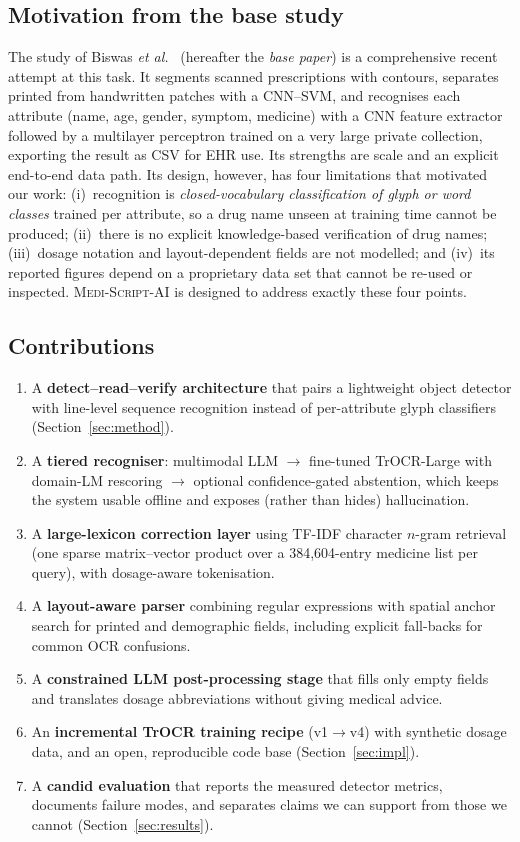 \documentclass[journal]{IEEEtran}
\newcommand{\sys}{\textsc{Medi-Script-AI}}
\begin{document}
\subsection{Motivation from the base study}
The study of Biswas \emph{et al.}~\cite{biswas2026novel} (hereafter the \emph{base paper}) is a comprehensive recent attempt at this task. It segments scanned prescriptions with contours, separates printed from handwritten patches with a CNN--SVM, and recognises each attribute (name, age, gender, symptom, medicine) with a CNN feature extractor followed by a multilayer perceptron trained on a very large private collection, exporting the result as CSV for EHR use. Its strengths are scale and an explicit end-to-end data path. Its design, however, has four limitations that motivated our work: (i)~recognition is \emph{closed-vocabulary classification of glyph or word classes} trained per attribute, so a drug name unseen at training time cannot be produced; (ii)~there is no explicit knowledge-based verification of drug names; (iii)~dosage notation and layout-dependent fields are not modelled; and (iv)~its reported figures depend on a proprietary data set that cannot be re-used or inspected. \sys{} is designed to address exactly these four points.

\subsection{Contributions}
\begin{enumerate}
  \item A \textbf{detect--read--verify architecture} that pairs a lightweight object detector with line-level sequence recognition instead of per-attribute glyph classifiers (Section~\ref{sec:method}).
  \item A \textbf{tiered recogniser}: multimodal LLM $\rightarrow$ fine-tuned TrOCR-Large with domain-LM rescoring $\rightarrow$ optional confidence-gated abstention, which keeps the system usable offline and exposes (rather than hides) hallucination.
  \item A \textbf{large-lexicon correction layer} using TF-IDF character $n$-gram retrieval (one sparse matrix--vector product over a 384{,}604-entry medicine list per query), with dosage-aware tokenisation.
  \item A \textbf{layout-aware parser} combining regular expressions with spatial anchor search for printed and demographic fields, including explicit fall-backs for common OCR confusions.
  \item A \textbf{constrained LLM post-processing stage} that fills only empty fields and translates dosage abbreviations without giving medical advice.
  \item An \textbf{incremental TrOCR training recipe} (v1$\rightarrow$v4) with synthetic dosage data, and an open, reproducible code base (Section~\ref{sec:impl}).
  \item A \textbf{candid evaluation} that reports the measured detector metrics, documents failure modes, and separates claims we can support from those we cannot (Section~\ref{sec:results}).
\end{enumerate}
\end{document}
